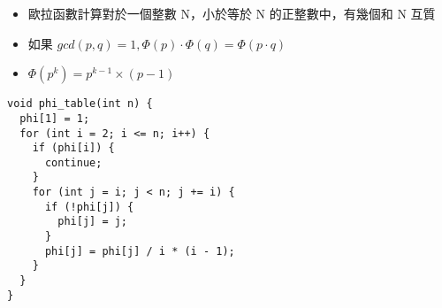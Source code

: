 \begin{itemize}
    \item 歐拉函數計算對於一個整數 N，小於等於 N 的正整數中，有幾個和 N 互質
    \item 如果 $gcd(p, q) = 1, \Phi(p) \cdot \Phi(q) = \Phi(p \cdot q)$
    \item $\Phi(p^k) = p^{k - 1} \times (p - 1)$
\end{itemize}

\begin{lstlisting}
void phi_table(int n) {
  phi[1] = 1;
  for (int i = 2; i <= n; i++) {
    if (phi[i]) {
      continue;
    }
    for (int j = i; j < n; j += i) {
      if (!phi[j]) {
        phi[j] = j;
      }
      phi[j] = phi[j] / i * (i - 1);
    }
  }
}
\end{lstlisting}